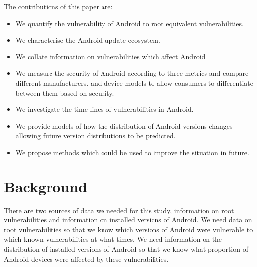 \documentclass[conference,a4paper,twoside]{IEEEtran}
\begin{document}
The contributions of this paper are:
\begin{itemize}
 \item We quantify the vulnerability of Android to root equivalent vulnerabilities.
 \item We characterise the Android update ecosystem.
 \item We collate information on vulnerabilities which affect Android.
 \item We measure the security of Android according to three metrics and compare different manufacturers. and device models to allow consumers to differentiate between them based on security.
 \item We investigate the time-lines of vulnerabilities in Android.
 \item We provide models of how the distribution of Android versions changes allowing future version distributions to be predicted.
 \item We propose methods which could be used to improve the situation in future.
\end{itemize}

\section{Background}
\label{sec:background}
There are two sources of data we needed for this study, information on root vulnerabilities and information on installed versions of Android.
We need data on root vulnerabilities so that we know which versions of Android were vulnerable to which known vulnerabilities at what times.
We need information on the distribution of installed versions of Android so that we know what proportion of Android devices were affected by these vulnerabilities.
\end{document}

